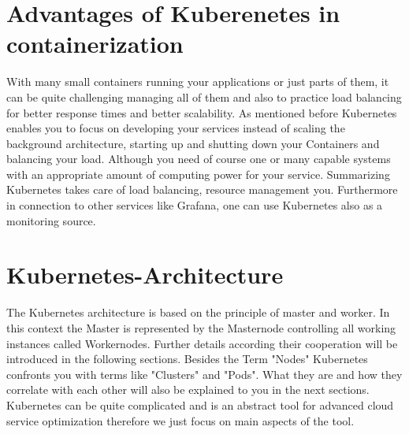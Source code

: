 \newpage\section{Advantages of Kuberenetes in containerization}
With many small containers running your applications or just parts of them, it can be quite challenging managing all of them and also to practice load balancing for better response times and better scalability. 
As mentioned before Kubernetes enables you to focus on developing your services instead of scaling the background architecture, starting up and shutting down your Containers and balancing your load. Although you need of course one or many capable systems with an appropriate amount of computing power for your service. Summarizing Kubernetes takes care of load balancing, resource management you. Furthermore in connection to other services like Grafana, one can use Kubernetes also as a monitoring source. \cite{Microsoft:2021,IBM:2021,SFL:2017,Cloud:2020,Kubernetes:2022} \label{sec:Advantages_Kubernetes}

\section{Kubernetes-Architecture}
The Kubernetes architecture is based on the principle of master and worker. In this context the Master is represented by the Masternode controlling all working instances called Workernodes. Further details according their cooperation will be introduced in the following sections. 
Besides the Term "Nodes" Kubernetes confronts you with terms like "Clusters" and "Pods". What they are and how they correlate with each other will also be explained to you in the next sections. Kubernetes can be quite complicated and is an abstract tool for advanced cloud service optimization therefore we just focus on main aspects of the tool.\cite{Ionos:2022}
